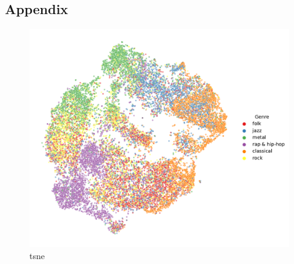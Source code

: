 \documentclass{article}
\begin{document}
\begin{appendix}
\section{Appendix}

\newpage

\begin{figure}
  \centering
  \includegraphics[width=1.0\textwidth]{../figures/tsne_genres.pdf}
  \caption{tsne}
  \label{fig:tsne_genres}
\end{figure}

\end{appendix}
\end{document}
